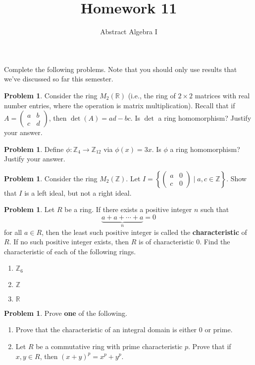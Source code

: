 \documentclass[11pt]{scrartcl}
\theoremstyle{definition}
\newtheorem{problem}[theorem]{Problem}
\begin{document}
\title{Homework 11}
\subtitle{Abstract Algebra I}
\date{}

\maketitle
\thispagestyle{fancy}

Complete the following problems. Note that you should only use results that we've discussed so far this semester.

\begin{problem}
Consider the ring $M_2(\mathbb{R})$ (i.e., the ring of $2\times 2$ matrices with real number entries, where the operation is matrix multiplication).  Recall that if $\displaystyle A=\begin{pmatrix} a & b\\ c & d\end{pmatrix}$, then $\det(A)=ad-bc$.  Is $\det$ a ring homomorphism?  Justify your answer.
\end{problem}

\begin{problem}
Define $\phi:\mathbb{Z}_4\to \mathbb{Z}_{12}$ via $\phi(x)=3x$. Is $\phi$ a ring homomorphism? Justify your answer.
\end{problem}

\begin{problem}
Consider the ring $M_2(\mathbb{Z})$.  Let $I=\left\{\begin{pmatrix}a & 0\\ c & 0\end{pmatrix}\mid a,c\in \mathbb{Z}\right\}$.  Show that $I$ is a left ideal, but not a right ideal.
\end{problem}

\begin{problem}
Let $R$ be a ring.  If there exists a positive integer $n$ such that
\[
\underbrace{a+a+\cdots +a}_n=0
\]
for all $a\in R$, then the least such positive integer is called the \textbf{characteristic} of $R$. If no such positive integer exists, then $R$ is of characteristic 0. Find the characteristic of each of the following rings.
\begin{enumerate}[label=\rm{(\alph*)}]
\item $\mathbb{Z}_6$
\item $\mathbb{Z}$
\item $\mathbb{R}$
\end{enumerate}
\end{problem}

\begin{problem}
Prove \textbf{one} of the following.
\begin{enumerate}[label=\rm{(\alph*)}]
\item Prove that the characteristic of an integral domain is either 0 or prime.
\item Let $R$ be a commutative ring with prime characteristic $p$.  Prove that if $x,y\in R$, then $(x+y)^p=x^p+y^p$.
\end{enumerate}
\end{problem}
\end{document}
